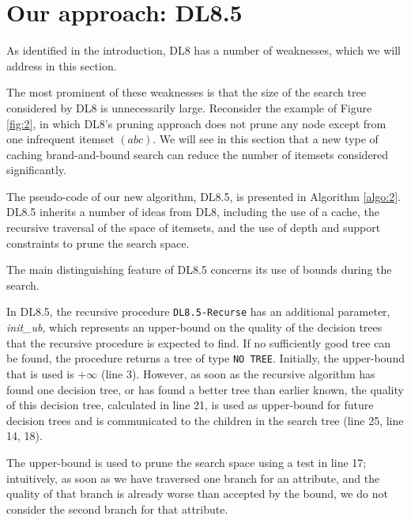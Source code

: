 \section{Our approach: DL8.5}
As identified in the introduction, DL8 has a number of weaknesses, which we will address in this section.

The most prominent of these weaknesses is that the size of the search tree considered by DL8 is unnecessarily large. Reconsider the example of Figure \ref{fig:2}, in which DL8’s pruning approach does not prune any node except from one infrequent itemset $(abc)$. We will see in this section that a new type of caching brand-and-bound search can reduce the number of itemsets considered significantly.

The pseudo-code of our new algorithm, DL8.5, is presented in Algorithm \ref{algo:2}. DL8.5 inherits a number of ideas from DL8, including the use of a cache, the recursive traversal of the space of itemsets, and the use of depth and support constraints to prune the search space.

The main distinguishing feature of DL8.5 concerns its use of bounds during the search.

In DL8.5, the recursive procedure \verb|DL8.5-Recurse| has an additional parameter, \emph{init\_ub}, which represents an upper-bound on the quality of the decision trees that the recursive procedure is expected to find. If no sufficiently good tree can be found, the procedure returns a tree of type \verb|NO TREE|. Initially, the upper-bound that is used is $+\infty$ (line 3). However, as soon as the recursive algorithm has found one decision tree, or has found a better tree than earlier known, the quality of this decision tree, calculated in line 21, is used as upper-bound for future decision trees and is communicated to the children in the search tree (line 25, line 14, 18).

The upper-bound is used to prune the search space using a test in line 17; intuitively, as soon as we have traversed one branch for an attribute, and the quality of that branch is already worse than accepted by the bound, we do not consider the second branch for that attribute.


